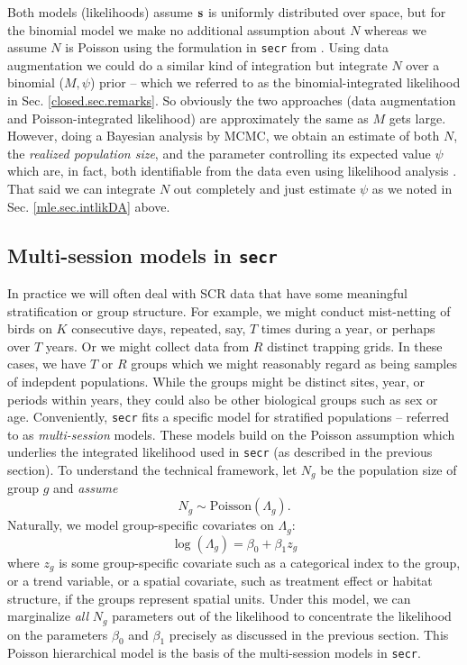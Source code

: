 Both models (likelihoods) assume ${\bf s}$ is uniformly distributed
over space, but for the binomial model we make no additional
assumption about $N$ whereas we assume $N$ is Poisson using the
formulation in \mbox{\tt secr} from \citep{borchers_efford:2008}.
Using data augmentation we could do a similar kind of integration but
integrate $N$ over a binomial ($M,\psi$) prior -- which we referred to
as the binomial-integrated likelihood in
Sec. \ref{closed.sec.remarks}. So obviously the two approaches (data
augmentation and Poisson-integrated likelihood) are approximately the
same as $M$ gets large. However, doing a Bayesian analysis by MCMC, we
obtain an estimate of both $N$, the {\it realized population size},
and the parameter controlling its expected value $\psi$ which are, in
fact, both identifiable from the data even using likelihood analysis
\citep{royle_etal:2007}.  That said we can integrate $N$ out
completely and just estimate $\psi$ as we noted in Sec.
\ref{mle.sec.intlikDA} above.  











\subsection{Multi-session models in \mbox{\tt secr}}
\label{mle.sec.multisession}

In practice we will often deal with SCR data that have some meaningful
stratification or group structure.  For example, we might conduct
mist-netting of birds on $K$ consecutive days, repeated, say, $T$
times during a year, or perhaps over $T$ years. Or we might collect
data from $R$ distinct trapping grids.  In these cases, we have $T$ or
$R$ groups which we might reasonably regard as being samples of
indepdent populations.  While the groups might be distinct sites,
year, or periods within years, they could also be other biological
groups such as sex or age.  Conveniently, \mbox{\tt secr} fits a
specific model for stratified populations -- referred to as {\it
  multi-session} models. These models build on the Poisson assumption
which underlies the integrated likelihood used in \mbox{\tt secr} (as
described in the previous section).  To understand the technical
framework, let $N_{g}$ be the population size of group $g$ and {\it
  assume}
\[
 N_{g} \sim \mbox{Poisson}(\Lambda_{g}).
\]
Naturally, we model group-specific covariates on $\Lambda_{g}$:
\[
 \log(\Lambda_{g}) = \beta_{0} + \beta_{1} z_{g}
\]
where $z_{g}$ is some group-specific covariate such as a categorical index to the group, or a trend variable, or a spatial 
covariate, such as treatment effect or habitat structure, if the groups
represent spatial units. 
Under this model,  we can marginalize {\it all} $N_{g}$ parameters out
of the likelihood to concentrate the likelihood on the parameters
$\beta_{0}$ and $\beta_{1}$ precisely as discussed in the previous
section. This Poisson hierarchical model 
is the basis of the multi-session models in \mbox{\tt  secr}.

